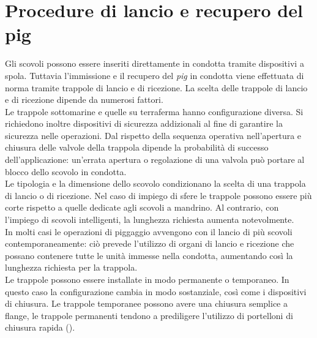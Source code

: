 \section{Procedure di lancio e recupero del pig}
Gli scovoli possono essere inseriti direttamente in condotta tramite dispositivi a spola. Tuttavia l'immissione e il recupero del \textit{pig} in condotta viene effettuata di norma tramite trappole di lancio e di ricezione. La scelta delle trappole di lancio e di ricezione dipende da numerosi fattori.\\
Le trappole sottomarine e quelle su terraferma hanno configurazione diversa. Si richiedono inoltre dispositivi di sicurezza addizionali al fine di garantire la sicurezza nelle operazioni. Dal rispetto della sequenza operativa nell'apertura e chiusura delle valvole della trappola dipende la probabilità di successo dell'applicazione: un'errata apertura o regolazione di una valvola può portare al blocco dello scovolo in condotta.\\
Le tipologia e la dimensione dello scovolo condizionano la scelta di una trappola di lancio o di ricezione. Nel caso di impiego di sfere le trappole possono essere più corte rispetto a quelle dedicate agli scovoli a mandrino. Al contrario, con l'impiego di scovoli intelligenti, la lunghezza richiesta aumenta notevolmente.\\
In molti casi le operazioni di piggaggio avvengono con il lancio di più scovoli contemporaneamente: ciò prevede l'utilizzo di organi di lancio e ricezione che possano contenere tutte le unità immesse nella condotta, aumentando così la lunghezza richiesta per la trappola.\\
Le trappole possono essere installate in modo permanente o temporaneo. In questo caso la configurazione cambia in modo sostanziale, così come i dispositivi di chiusura. Le trappole temporanee possono avere una chiusura semplice a flange, le trappole permanenti tendono a prediligere l'utilizzo di portelloni di chiusura rapida ().
